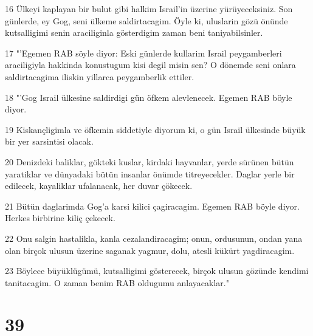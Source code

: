 \par 16 Ülkeyi kaplayan bir bulut gibi halkim Israil'in üzerine yürüyeceksiniz. Son günlerde, ey Gog, seni ülkeme saldirtacagim. Öyle ki, uluslarin gözü önünde kutsalligimi senin araciliginla gösterdigim zaman beni taniyabilsinler.
\par 17 "'Egemen RAB söyle diyor: Eski günlerde kullarim Israil peygamberleri araciligiyla hakkinda konustugum kisi degil misin sen? O dönemde seni onlara saldirtacagima iliskin yillarca peygamberlik ettiler.
\par 18 "'Gog Israil ülkesine saldirdigi gün öfkem alevlenecek. Egemen RAB böyle diyor.
\par 19 Kiskançligimla ve öfkemin siddetiyle diyorum ki, o gün Israil ülkesinde büyük bir yer sarsintisi olacak.
\par 20 Denizdeki baliklar, gökteki kuslar, kirdaki hayvanlar, yerde sürünen bütün yaratiklar ve dünyadaki bütün insanlar önümde titreyecekler. Daglar yerle bir edilecek, kayaliklar ufalanacak, her duvar çökecek.
\par 21 Bütün daglarimda Gog'a karsi kilici çagiracagim. Egemen RAB böyle diyor. Herkes birbirine kiliç çekecek.
\par 22 Onu salgin hastalikla, kanla cezalandiracagim; onun, ordusunun, ondan yana olan birçok ulusun üzerine saganak yagmur, dolu, atesli kükürt yagdiracagim.
\par 23 Böylece büyüklügümü, kutsalligimi gösterecek, birçok ulusun gözünde kendimi tanitacagim. O zaman benim RAB oldugumu anlayacaklar."

\chapter{39}

